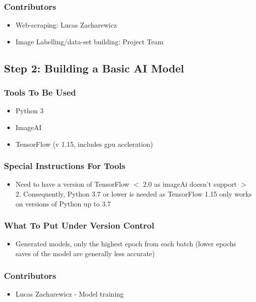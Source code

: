 \documentclass[12pt, titlepage]{article}
\begin{document}
\subsubsection*{Contributors}
\begin{itemize}
    \item Web-scraping: Lucas Zacharewicz
    \item Image Labelling/data-set building: Project Team
\end{itemize}

\subsection{Step 2: Building a Basic AI Model}
\subsubsection*{Tools To Be Used}
\begin{itemize}
        \item Python 3
        \item ImageAI
        \item TensorFlow (v 1.15, includes gpu accleration)
\end{itemize}
\subsubsection*{Special Instructions For Tools}
\begin{itemize}
        \item Need to have a version of TensorFlow $<$ 2.0 as imageAi doesn't support $>$ 2. Consequently, Python 3.7 or lower is needed as TensorFlow 1.15 only works on versions of Python up to 3.7
\end{itemize}
\subsubsection*{What To Put Under Version Control}
\begin{itemize}
        \item Generated models, only the highest epoch from each batch (lower epochs saves of the model are generally less accurate)
\end{itemize}
\subsubsection*{Contributors}
\begin{itemize}
        \item Lucas Zacharewicz - Model training 
\end{itemize}\textbf{}
\end{document}
